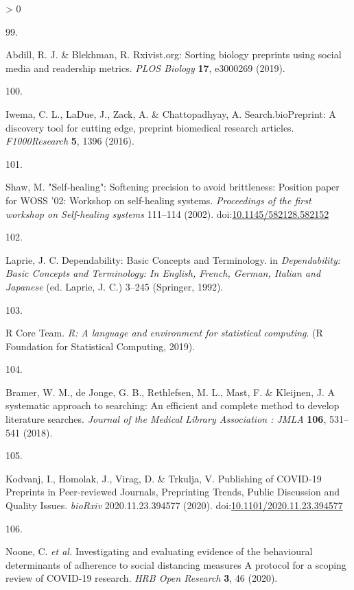 \documentclass[a4paper, twoside]{templates/ociamthesis}
\newlength{\cslhangindent}
\newlength{\csllabelwidth}
\newenvironment{CSLReferences}[3] %
 {%
  \setlength{\parindent}{0pt}
  \ifodd #1 \everypar{\setlength{\hangindent}{\cslhangindent}}\ignorespaces\fi
  \ifnum #2 > 0
  \setlength{\parskip}{#2\baselineskip}
  \fi
 }%
 {}
\newcommand{\CSLLeftMargin}[1]{\parbox[t]{\maxof{\widthof{#1}}{\csllabelwidth}}{#1}}
\newcommand{\CSLRightInline}[1]{\parbox[t]{\linewidth - \csllabelwidth}{#1}}
\begin{document}
\begin{CSLReferences}{0}{0}
\leavevmode\hypertarget{ref-abdill2019}{}%
\CSLLeftMargin{99. }
\CSLRightInline{Abdill, R. J. \& Blekhman, R. Rxivist.org: {Sorting} biology preprints using social media and readership metrics. \emph{PLOS Biology} \textbf{17}, e3000269 (2019).}

\leavevmode\hypertarget{ref-iwema2016}{}%
\CSLLeftMargin{100. }
\CSLRightInline{Iwema, C. L., LaDue, J., Zack, A. \& Chattopadhyay, A. Search.{bioPreprint}: A discovery tool for cutting edge, preprint biomedical research articles. \emph{F1000Research} \textbf{5}, 1396 (2016).}

\leavevmode\hypertarget{ref-shaw2002}{}%
\CSLLeftMargin{101. }
\CSLRightInline{Shaw, M. "{Self}-healing": Softening precision to avoid brittleness: Position paper for {WOSS} '02: Workshop on self-healing systems. \emph{Proceedings of the first workshop on Self-healing systems} 111--114 (2002). doi:\href{https://doi.org/10.1145/582128.582152}{10.1145/582128.582152}}

\leavevmode\hypertarget{ref-laprie1992}{}%
\CSLLeftMargin{102. }
\CSLRightInline{Laprie, J. C. Dependability: {Basic Concepts} and {Terminology}. in \emph{Dependability: {Basic Concepts} and {Terminology}: {In English}, {French}, {German}, {Italian} and {Japanese}} (ed. Laprie, J. C.) 3--245 ({Springer}, 1992).}

\leavevmode\hypertarget{ref-rcoreteam2019}{}%
\CSLLeftMargin{103. }
\CSLRightInline{R Core Team. \emph{R: {A} language and environment for statistical computing}. ({R Foundation for Statistical Computing}, 2019).}

\leavevmode\hypertarget{ref-bramer2018}{}%
\CSLLeftMargin{104. }
\CSLRightInline{Bramer, W. M., de Jonge, G. B., Rethlefsen, M. L., Mast, F. \& Kleijnen, J. A systematic approach to searching: An efficient and complete method to develop literature searches. \emph{Journal of the Medical Library Association : JMLA} \textbf{106}, 531--541 (2018).}

\leavevmode\hypertarget{ref-kodvanj2020}{}%
\CSLLeftMargin{105. }
\CSLRightInline{Kodvanj, I., Homolak, J., Virag, D. \& Trkulja, V. Publishing of {COVID}-19 {Preprints} in {Peer}-reviewed {Journals}, {Preprinting Trends}, {Public Discussion} and {Quality Issues}. \emph{bioRxiv} 2020.11.23.394577 (2020). doi:\href{https://doi.org/10.1101/2020.11.23.394577}{10.1101/2020.11.23.394577}}

\leavevmode\hypertarget{ref-noone2020}{}%
\CSLLeftMargin{106. }
\CSLRightInline{Noone, C. \emph{et al.} Investigating and evaluating evidence of the behavioural determinants of adherence to social distancing measures {} {A} protocol for a scoping review of {COVID}-19 research. \emph{HRB Open Research} \textbf{3}, 46 (2020).}


\end{CSLReferences}
\end{document}
